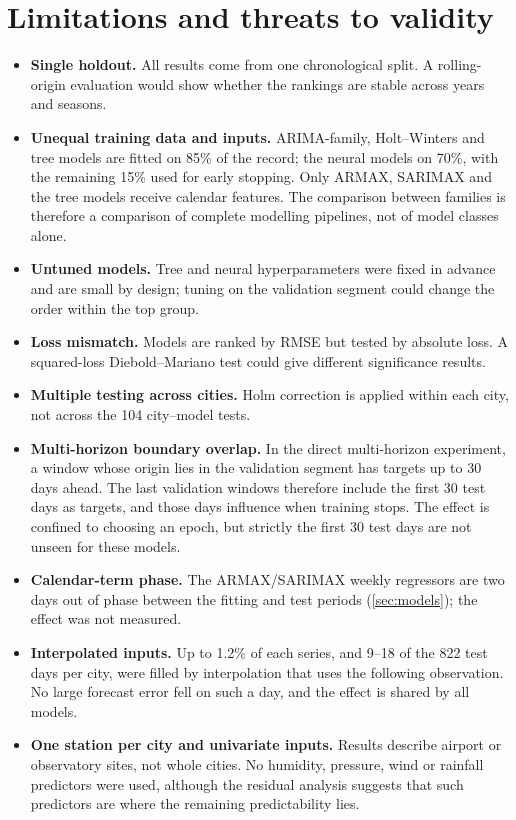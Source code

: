 \documentclass[11pt,a4paper]{article}
\begin{document}
\section{Limitations and threats to validity}
\label{sec:limits}

\begin{itemize}
  \item \textbf{Single holdout.} All results come from one chronological split. A rolling-origin evaluation would show whether the rankings are stable across years and seasons.
  \item \textbf{Unequal training data and inputs.} ARIMA-family, Holt--Winters and tree models are fitted on 85\% of the record; the neural models on 70\%, with the remaining 15\% used for early stopping. Only ARMAX, SARIMAX and the tree models receive calendar features. The comparison between families is therefore a comparison of complete modelling pipelines, not of model classes alone.
  \item \textbf{Untuned models.} Tree and neural hyperparameters were fixed in advance and are small by design; tuning on the validation segment could change the order within the top group.
  \item \textbf{Loss mismatch.} Models are ranked by RMSE but tested by absolute loss. A squared-loss Diebold--Mariano test could give different significance results.
  \item \textbf{Multiple testing across cities.} Holm correction is applied within each city, not across the 104 city--model tests.
  \item \textbf{Multi-horizon boundary overlap.} In the direct multi-horizon experiment, a window whose origin lies in the validation segment has targets up to 30 days ahead. The last validation windows therefore include the first 30 test days as targets, and those days influence when training stops. The effect is confined to choosing an epoch, but strictly the first 30 test days are not unseen for these models.
  \item \textbf{Calendar-term phase.} The ARMAX/SARIMAX weekly regressors are two days out of phase between the fitting and test periods (\cref{sec:models}); the effect was not measured.
  \item \textbf{Interpolated inputs.} Up to 1.2\% of each series, and 9--18 of the 822 test days per city, were filled by interpolation that uses the following observation. No large forecast error fell on such a day, and the effect is shared by all models.
  \item \textbf{One station per city and univariate inputs.} Results describe airport or observatory sites, not whole cities. No humidity, pressure, wind or rainfall predictors were used, although the residual analysis suggests that such predictors are where the remaining predictability lies.
\end{itemize}
\end{document}
